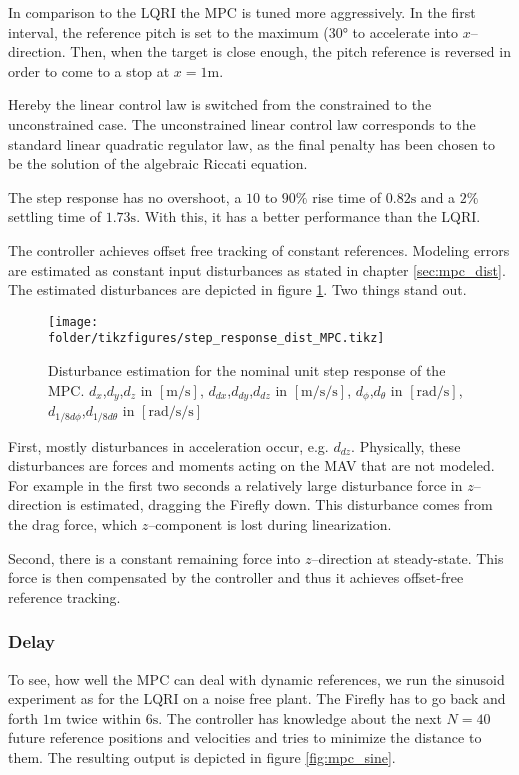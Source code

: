 In comparison to the LQRI the MPC is tuned more aggressively. In the first interval, the reference pitch is set to the maximum ($30\si{\degree}$ to accelerate into $x$--direction. Then, when the target is close enough, the pitch reference is reversed in order to come to a stop at $x=1\si{\metre}$.

Hereby the linear control law is switched from the constrained to the unconstrained case. The unconstrained linear control law corresponds to the standard linear quadratic regulator law, as the final penalty has been chosen to be the solution of the algebraic Riccati equation.

The step response has no overshoot, a $10$ to $90\si{\percent}$ rise time of $0.82 \si{\second}$ and a $2\si{\percent}$ settling time of $1.73 \si{\second}$. With this, it has a better performance than the LQRI.

The controller achieves offset free tracking of constant references. Modeling errors are estimated as constant input disturbances as stated in chapter \ref{sec:mpc_dist}. The estimated disturbances are depicted in figure \ref{fig:mpc_step_dist}. Two things stand out.

\begin{figure}
\centering
\texttt{[image: \\folder/tikzfigures/step\_response\_dist\_MPC.tikz]}
\label{fig:mpc_step_dist}
\caption{Disturbance estimation for the nominal unit step response of the MPC. $d_x$,$d_y$,$d_z$ in $[\si{\metre\per\second}]$, $d_{dx}$,$d_{dy}$,$d_{dz}$ in $[\si{\metre\per\second\per\second}]$, $d_\phi$,$d_\theta$ in $[\si{\radian\per\second}]$, $d_{1/8d\phi}$,$d_{1/8d\theta}$ in $[\si{\radian\per\second\per\second}]$}
\end{figure}

First, mostly disturbances in acceleration occur, e.g. $d_{dz}$. Physically, these disturbances are forces and moments acting on the MAV that are not modeled. For example in the first two seconds a relatively large disturbance force in $z$--direction is estimated, dragging the Firefly down. This disturbance comes from the drag force, which $z$--component is lost during linearization.

Second, there is a constant remaining force into $z$--direction at steady-state. This force is then compensated by the controller and thus it achieves offset-free reference tracking.

\subsubsection{Delay}
To see, how well the MPC can deal with dynamic references, we run the sinusoid experiment as for the LQRI on a noise free plant. The Firefly has to go back and forth $1\si{\metre}$ twice within $6 \si{\second}$. The controller has knowledge about the next $N=40$ future reference positions and velocities and tries to minimize the distance to them. The resulting output is depicted in figure \ref{fig:mpc_sine}.

